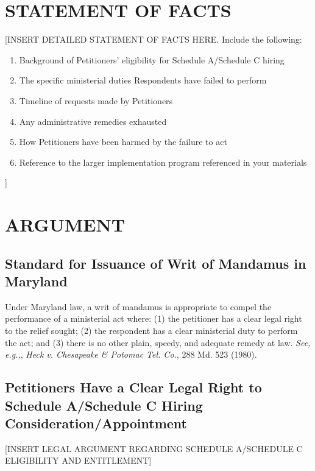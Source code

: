 \documentclass[12pt]{article}
\begin{document}
\section{STATEMENT OF FACTS}

[INSERT DETAILED STATEMENT OF FACTS HERE. Include the following:
\begin{enumerate}
    \item Background of Petitioners' eligibility for Schedule A/Schedule C hiring
    \item The specific ministerial duties Respondents have failed to perform
    \item Timeline of requests made by Petitioners
    \item Any administrative remedies exhausted
    \item How Petitioners have been harmed by the failure to act
    \item Reference to the larger implementation program referenced in your materials
\end{enumerate}]

\section{ARGUMENT}

\subsection{Standard for Issuance of Writ of Mandamus in Maryland}

Under Maryland law, a writ of mandamus is appropriate to compel the performance of a ministerial act where: (1) the petitioner has a clear legal right to the relief sought; (2) the respondent has a clear ministerial duty to perform the act; and (3) there is no other plain, speedy, and adequate remedy at law. \textit{See, e.g.,}, \textit{Heck v. Chesapeake \& Potomac Tel. Co.}, 288 Md. 523 (1980).

\subsection{Petitioners Have a Clear Legal Right to Schedule A/Schedule C Hiring Consideration/Appointment}

[INSERT LEGAL ARGUMENT REGARDING SCHEDULE A/SCHEDULE C ELIGIBILITY AND ENTITLEMENT]
\end{document}

